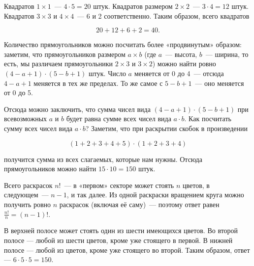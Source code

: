 \begin{itemize}
\itA Квадратов $1 \times 1$~— $4 \cdot 5 = 20$ штук. Квадратов размером $2 \times 2$~— $3 \cdot 4 = 12$ штук. Квадратов $3 \times 3$ и $4 \times 4$~— 6 и 2 соответственно. Таким образом, всего квадратов

$$20 + 12 + 6 + 2 = 40.$$

Количество прямоугольников можно посчитать более «продвинутым» образом: заметим, что прямоугольников размером $a \times b$ (где $a$~— высота, $b$~— ширина, то есть, мы различаем прямоугольники $2 \times 3$ и $3 \times 2$) можно найти ровно $(4-a+1) \cdot (5-b+1)$ штук. Число $a$ меняется от 0 до 4~— отсюда $4-a+1$ меняется в тех же пределах. То же самое с $5-b+1$~— оно меняется от 0 до 5.

\ms Отсюда можно заключить, что сумма чисел вида $(4-a+1) \cdot (5-b+1)$ при всевозможных $a$ и $b$ будет равна сумме всех чисел вида $a \cdot b$. Как посчитать сумму всех чисел вида $a \cdot b$? Заметим, что при раскрытии скобок в произведении

$$(1+2+3+4+5) \cdot (1+2+3+4)$$

получится сумма из всех слагаемых, которые нам нужны. Отсюда прямоугольников можно найти $15 \cdot 10 = 150$ штук.

\itB Всего раскрасок $n!$~— в «первом» секторе может стоять $n$ цветов, в следующем~— $n-1$, и так далее. Из одной раскраски вращением круга можно получить ровно $n$ раскрасок (включая её саму)~— поэтому ответ равен $\tfrac{n!}{n} = (n-1)!$.

\itC В верхней полосе может стоять один из шести имеющихся цветов. Во второй полосе — любой из шести цветов, кроме уже стоящего в первой. В нижней полосе — любой из цветов, кроме уже стоящего во второй. Таким образом, ответ — $6 \cdot 5 \cdot 5 = 150$.
\end{itemize}